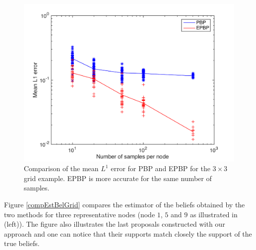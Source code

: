 \begin{figure}[!h]
\center
\includegraphics[width=.6\textwidth]{figures/epbp/errComparison}
\caption{\label{figCompGrid}Comparison of the mean $L^{1}$ error for PBP and EPBP for the $3\times 3$ grid example. EPBP is more accurate for the same number of samples.} %
\end{figure}

Figure \ref{compEstBelGrid} compares the estimator of the beliefs obtained by the two methods for three representative nodes (node $1$, $5$ and $9$ as illustrated in  (left)). The figure also illustrates the last proposals constructed with our approach and one can notice that their supports match closely the support of the true beliefs.

